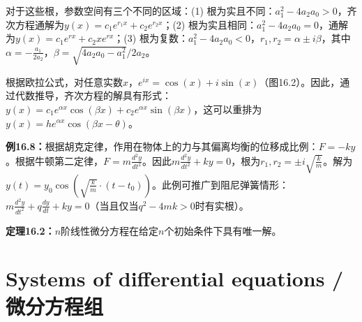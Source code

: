 \begin{translation}
对于这些根，参数空间有三个不同的区域：(1) 根为实且不同：$a_1^2 - 4a_2a_0 > 0$，齐次方程通解为$y(x) = c_1 e^{r_1x} + c_2 e^{r_2x}$；(2) 根为实且相同：$a_1^2 - 4a_2a_0 = 0$，通解为$y(x) = c_1 e^{rx} + c_2 x e^{rx}$；(3) 根为复数：$a_1^2 - 4a_2a_0 < 0$，$r_1, r_2 = \alpha \pm i\beta$，其中$\alpha = -\frac{a_1}{2a_2}$，$\beta = \sqrt{4a_2a_0 - a_1^2}/2a_2$。

根据欧拉公式，对任意实数$x$，$e^{ix} = \cos(x) + i \sin(x)$（图16.2）。因此，通过代数推导，齐次方程的解具有形式：$y(x) = c_1 e^{\alpha x} \cos(\beta x) + c_2 e^{\alpha x} \sin(\beta x)$，这可以重排为$y(x) = he^{\alpha x} \cos(\beta x - \theta)$。

\textbf{例16.8：}根据胡克定律，作用在物体上的力与其偏离均衡的位移成比例：$F = -k y$。根据牛顿第二定律，$F = m\frac{d^2 y}{dt^2}$。因此$m\frac{d^2 y}{dt^2} + k y = 0$，根为$r_1, r_2 = \pm i\sqrt{\frac{k}{m}}$。解为$y(t) = y_0 \cos(\sqrt{\frac{k}{m}} \cdot (t - t_0))$。此例可推广到阻尼弹簧情形：$m\frac{d^2 y}{dt^2} + q\frac{dy}{dt} + k y = 0$（当且仅当$q^2 - 4mk > 0$时有实根）。

\textbf{定理16.2：}$n$阶线性微分方程在给定$n$个初始条件下具有唯一解。
\end{translation}
\section{Systems of differential equations / 微分方程组}

